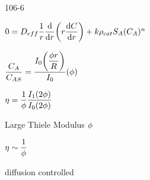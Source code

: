 \begin{mitframe}{106-6}
\begin{listone}
	\item $0=\elecdisplace_{eff}\dfrac{1}{\pos}\dfrac{\mathrm{d}}{\mathrm{d}\pos}\bigg(\pos\dfrac{\mathrm{d}\conc}{\mathrm{d}\pos}\bigg)+\thermcond\dens_{cat}\entropy_{\helmholtz}(\conc_{\helmholtz})^n$
    	\begin{listtwo}
        	\item $\dfrac{\conc_{\helmholtz}}{\conc_{\helmholtz\entropy}}=\dfrac{\mominertia_{\init}\bigg(\dfrac{\eleccoeff\pos}{\gasconst}\bigg)}{\mominertia_{\init}}(\eleccoeff)$
            \item $\intrinsvisc=\dfrac{1}{\eleccoeff}\dfrac{\mominertia_1(2\eleccoeff)}{\mominertia_{\init}(2\eleccoeff)}$
            \item Large Thiele Modulus $\eleccoeff$
            \begin{listthree}
            		\item $\intrinsvisc\sim\dfrac{1}{\eleccoeff}$
                    \item diffusion controlled
            \end{listthree}
        \end{listtwo}
\end{listone}    
\end{mitframe}